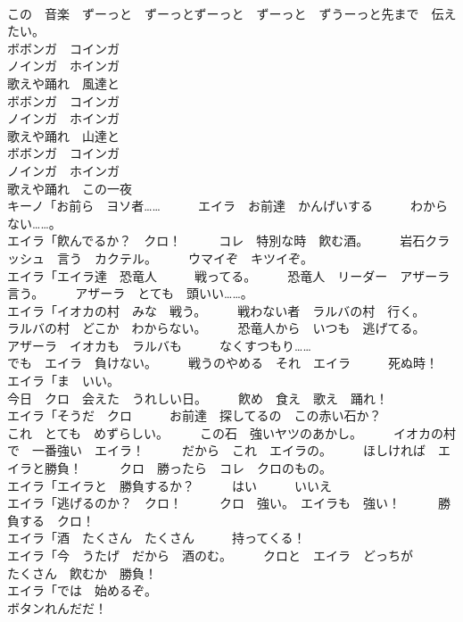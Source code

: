 \documentclass[8pt]{extreport}
\begin{document}
\begin{CJK}{UTF8}{min}
\\	この　音楽　ずーっと　ずーっとずーっと　ずーっと　ずうーっと先まで　伝えたい。	
\\	ボボンガ　コインガ
\\	ノインガ　ホインガ
\\	歌えや踊れ　風達と
\\	ボボンガ　コインガ
\\	ノインガ　ホインガ
\\	歌えや踊れ　山達と
\\	ボボンガ　コインガ
\\	ノインガ　ホインガ
\\	歌えや踊れ　この一夜
\\	キーノ「お前ら　ヨソ者……　　　エイラ　お前達　かんげいする　　　わからない……。	
\\	エイラ「飮んでるか？　クロ！　　　コレ　特別な時　飮む酒。　　　岩石クラッシュ　言う　カクテル。　　　ウマイぞ　キツイぞ。	
\\	エイラ「エイラ達　恐竜人　　　戦ってる。　　　恐竜人　リーダー　アザーラ　言う。　　　アザーラ　とても　頭いい……。	
\\	エイラ「イオカの村　みな　戦う。　　　戦わない者　ラルバの村　行く。　　　ラルバの村　どこか　わからない。　　　恐竜人から　いつも　逃げてる。	
\\	アザーラ　イオカも　ラルバも　　　なくすつもり……	
\\	でも　エイラ　負けない。　　　戦うのやめる　それ　エイラ　　　死ぬ時！	
\\	エイラ「ま　いい。	
\\	今日　クロ　会えた　うれしい日。　　　飮め　食え　歌え　踊れ！	
\\	エイラ「そうだ　クロ　　　お前達　探してるの　この赤い石か？	
\\	これ　とても　めずらしい。　　　この石　強いヤツのあかし。　　　イオカの村で　一番強い　エイラ！　　　だから　これ　エイラの。　　　ほしければ　エイラと勝負！　　　クロ　勝ったら　コレ　クロのもの。	
\\	エイラ「エイラと　勝負するか？　　　はい　　　いいえ	
\\	エイラ「逃げるのか？　クロ！　　　クロ　強い。　エイラも　強い！　　　勝負する　クロ！	
\\	エイラ「酒　たくさん　たくさん　　　持ってくる！	
\\	エイラ「今　うたげ　だから　酒のむ。　　　クロと　エイラ　どっちが　　　たくさん　飮むか　勝負！	
\\	エイラ「では　始めるぞ。　　　
\\	ボタンれんだだ！	

\end{CJK}
\end{document}
